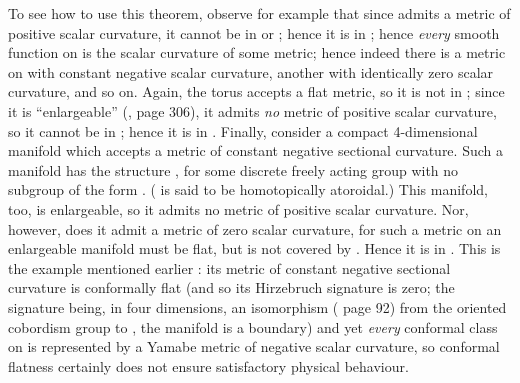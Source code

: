 \documentclass[a4paper,12pt]{article}
\providecommand{\field}[1]{\mathbb{#1}}
\providecommand{\R}{\field{R}}
\providecommand{\Z}{\field{Z}}
\theoremstyle{definition}
\renewcommand{\u}{\textit}
\renewcommand{\-}{\myHighlight{$\dfrac{\quad\enspace}{\quad}$}\coordHE{}}
\begin{document}
To see how to use this theorem, observe for example that since \coordHE{} admits a metric of positive scalar curvature, it cannot be in \coordHE{} or \coordHE{}; hence it is in \coordHE{}; hence \u{every} smooth function on \coordHE{} is the scalar curvature of some metric; hence indeed there is a metric on \coordHE{} with constant negative scalar curvature, another with identically zero scalar curvature, and so on. Again, the torus \coordHE{} accepts a flat metric, so it is not in \coordHE{}; since it is ``enlargeable'' (\cite{12}, page 306), it admits \u{no} metric of positive scalar curvature, so it cannot be in \coordHE{}; hence it is in \coordHE{}. Finally, consider a compact 4-dimensional manifold which accepts a metric of constant negative sectional curvature. Such a manifold has the structure \myHighlight{$\R^4/\Gamma$}\coordHE{}, for some discrete freely acting group \myHighlight{$\Gamma$}\coordHE{} with no subgroup of the form \myHighlight{$\Z\oplus\Z\oplus\Z\oplus\Z$}\coordHE{}. (\myHighlight{$\R^4/\Gamma$}\coordHE{} is said to be homotopically atoroidal.) This manifold, too, is enlargeable, so it admits no metric of positive scalar curvature. Nor, however, does it admit a metric of zero scalar curvature, for such a metric on an enlargeable manifold must be flat, but \myHighlight{$\R^4/\Gamma$}\coordHE{} is not covered by \coordHE{}. Hence it is in \coordHE{}. This is the example mentioned earlier : its metric of constant negative sectional curvature is conformally flat (and so its Hirzebruch signature is zero; the signature being, in four dimensions, an isomorphism (\cite{12} page 92) from the oriented cobordism group to \myHighlight{$\Z$}\coordHE{}, the manifold is a boundary) and yet \u{every} conformal class on \myHighlight{$\R^4/\Gamma$}\coordHE{} is represented by a Yamabe metric of negative scalar curvature, so conformal flatness certainly does not ensure satisfactory physical behaviour.
\end{document}
